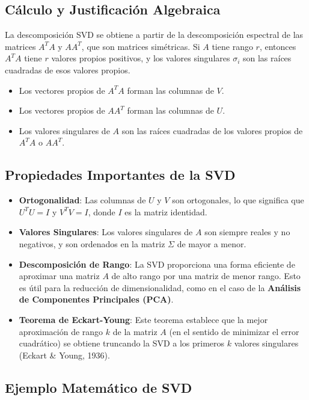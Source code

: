 \documentclass{article}
\begin{document}
\subsection{Cálculo y Justificación Algebraica}

La descomposición SVD se obtiene a partir de la descomposición espectral de las matrices \(A^T A\) y \(A A^T\), que son matrices simétricas. Si \(A\) tiene rango \(r\), entonces \(A^T A\) tiene \(r\) valores propios positivos, y los valores singulares \(\sigma_i\) son las raíces cuadradas de esos valores propios.

\begin{itemize}
  \item Los vectores propios de \(A^T A\) forman las columnas de \(V\).
  \item Los vectores propios de \(A A^T\) forman las columnas de \(U\).
  \item Los valores singulares de \(A\) son las raíces cuadradas de los valores propios de \(A^T A\) o \(A A^T\).
\end{itemize}

\subsection{Propiedades Importantes de la SVD}

\begin{itemize}
  \item \textbf{Ortogonalidad}: Las columnas de \(U\) y \(V\) son ortogonales, lo que significa que \(U^T U = I\) y \(V^T V = I\), donde \(I\) es la matriz identidad.
  \item \textbf{Valores Singulares}: Los valores singulares de \(A\) son siempre reales y no negativos, y son ordenados en la matriz \(\Sigma\) de mayor a menor.
  \item \textbf{Descomposición de Rango}: La SVD proporciona una forma eficiente de aproximar una matriz \(A\) de alto rango por una matriz de menor rango. Esto es útil para la reducción de dimensionalidad, como en el caso de la \textbf{Análisis de Componentes Principales (PCA)}.
  \item \textbf{Teorema de Eckart-Young}: Este teorema establece que la mejor aproximación de rango \(k\) de la matriz \(A\) (en el sentido de minimizar el error cuadrático) se obtiene truncando la SVD a los primeros \(k\) valores singulares (Eckart \& Young, 1936).
\end{itemize}

\subsection{Ejemplo Matemático de SVD}
\end{document}
